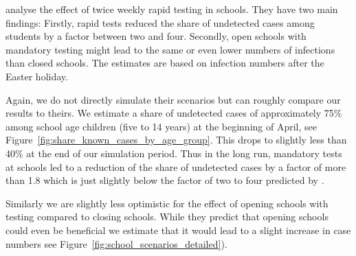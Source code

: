 \citet{Berger2021} analyse the effect of twice weekly rapid testing in schools. They
have two main findings: Firstly, rapid tests reduced the share of undetected cases
among students by a factor between two and four. Secondly, open schools with mandatory
testing might lead to the same or even lower numbers of infections than closed
schools. The estimates are based on infection numbers after the Easter holiday.

Again, we do not directly simulate their scenarios but can roughly compare our results
to theirs. We estimate a share of undetected cases of approximately 75\% among school
age children (five to 14 years) at the beginning of April, see
Figure~\ref{fig:share_known_cases_by_age_group}. This drops to slightly less than 40\%
at the end of our simulation period. Thus in the long run, mandatory tests at schools
led to a reduction of the share of undetected cases by a factor of more than 1.8 which
is just slightly below the factor of two to four predicted by \citet{Berger2021}.

Similarly we are slightly less optimistic for the effect of opening schools with testing
compared to closing schools. While they predict that opening schools could even be
beneficial we estimate that it would lead to a slight increase in case numbers see
Figure~\ref{fig:school_scenarios_detailed}).





\FloatBarrier
